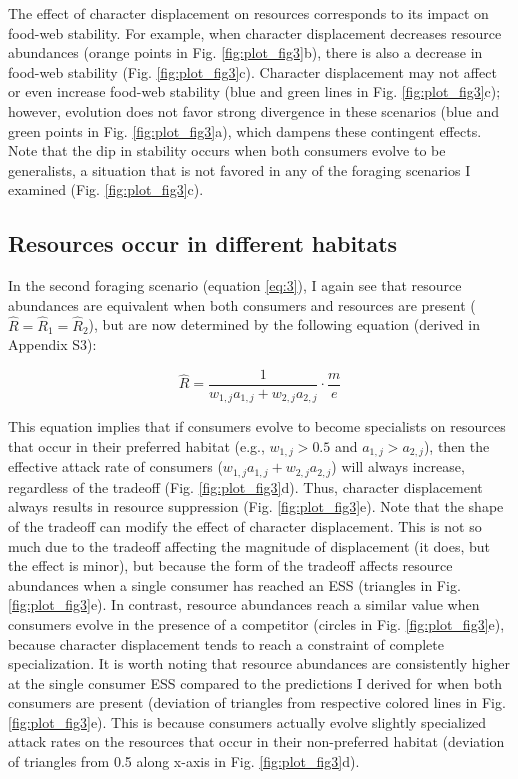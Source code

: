 \documentclass[11pt,]{article}
\begin{document}
The effect of character displacement on resources corresponds to its
impact on food-web stability. For example, when character displacement
decreases resource abundances (orange points in Fig.
\ref{fig:plot_fig3}b), there is also a decrease in food-web stability
(Fig. \ref{fig:plot_fig3}c). Character displacement may not affect or
even increase food-web stability (blue and green lines in Fig.
\ref{fig:plot_fig3}c); however, evolution does not favor strong
divergence in these scenarios (blue and green points in Fig.
\ref{fig:plot_fig3}a), which dampens these contingent effects. Note that
the dip in stability occurs when both consumers evolve to be
generalists, a situation that is not favored in any of the foraging
scenarios I examined (Fig. \ref{fig:plot_fig3}c).

\subsection{Resources occur in different
habitats}\label{resources-occur-in-different-habitats}

In the second foraging scenario (equation \ref{eq:3}), I again see that
resource abundances are equivalent when both consumers and resources are
present (\(\hat R = \hat R_1 = \hat R_2\)), but are now determined by
the following equation (derived in Appendix S3):

\begin{equation} \label{eq:6}
  \hat{R}=\frac{1}{w_{1,j}a_{1,j}+w_{2,j}a_{2,j}}\cdot\frac{m}{e}
\end{equation}

This equation implies that if consumers evolve to become specialists on
resources that occur in their preferred habitat (e.g., \(w_{1,j}>0.5\)
and \(a_{1,j}>a_{2,j}\)), then the effective attack rate of consumers
(\(w_{1,j}a_{1,j}+w_{2,j}a_{2,j}\)) will always increase, regardless of
the tradeoff (Fig. \ref{fig:plot_fig3}d). Thus, character displacement
always results in resource suppression (Fig. \ref{fig:plot_fig3}e). Note
that the shape of the tradeoff can modify the effect of character
displacement. This is not so much due to the tradeoff affecting the
magnitude of displacement (it does, but the effect is minor), but
because the form of the tradeoff affects resource abundances when a
single consumer has reached an ESS (triangles in Fig.
\ref{fig:plot_fig3}e). In contrast, resource abundances reach a similar
value when consumers evolve in the presence of a competitor (circles in
Fig. \ref{fig:plot_fig3}e), because character displacement tends to
reach a constraint of complete specialization. It is worth noting that
resource abundances are consistently higher at the single consumer ESS
compared to the predictions I derived for when both consumers are
present (deviation of triangles from respective colored lines in Fig.
\ref{fig:plot_fig3}e). This is because consumers actually evolve
slightly specialized attack rates on the resources that occur in their
non-preferred habitat (deviation of triangles from 0.5 along x-axis in
Fig. \ref{fig:plot_fig3}d).
\end{document}
